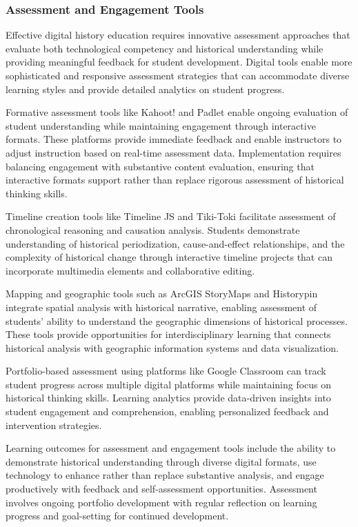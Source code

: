 \subsubsection {Assessment and Engagement Tools}

Effective digital history education requires innovative assessment approaches that evaluate both technological competency and historical understanding while providing meaningful feedback for student development. Digital tools enable more sophisticated and responsive assessment strategies that can accommodate diverse learning styles and provide detailed analytics on student progress.

Formative assessment tools like Kahoot! and Padlet enable ongoing evaluation of student understanding while maintaining engagement through interactive formats. These platforms provide immediate feedback and enable instructors to adjust instruction based on real-time assessment data. Implementation requires balancing engagement with substantive content evaluation, ensuring that interactive formats support rather than replace rigorous assessment of historical thinking skills.

Timeline creation tools like Timeline JS and Tiki-Toki facilitate assessment of chronological reasoning and causation analysis. Students demonstrate understanding of historical periodization, cause-and-effect relationships, and the complexity of historical change through interactive timeline projects that can incorporate multimedia elements and collaborative editing.

Mapping and geographic tools such as ArcGIS StoryMaps and Historypin integrate spatial analysis with historical narrative, enabling assessment of students' ability to understand the geographic dimensions of historical processes. These tools provide opportunities for interdisciplinary learning that connects historical analysis with geographic information systems and data visualization.

Portfolio-based assessment using platforms like Google Classroom can track student progress across multiple digital platforms while maintaining focus on historical thinking skills. Learning analytics provide data-driven insights into student engagement and comprehension, enabling personalized feedback and intervention strategies.

Learning outcomes for assessment and engagement tools include the ability to demonstrate historical understanding through diverse digital formats, use technology to enhance rather than replace substantive analysis, and engage productively with feedback and self-assessment opportunities. Assessment involves ongoing portfolio development with regular reflection on learning progress and goal-setting for continued development.

